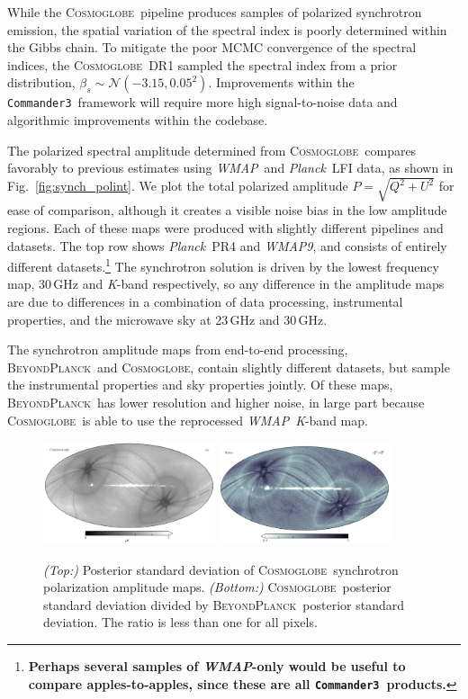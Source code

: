 \documentclass[twocolumn]{../../common/aa}
\def\WMAP{\emph{WMAP}}
\def\WMAPnine{\emph{WMAP9}}
\def\Planck{\emph{Planck}}
\def\commanderthree{\texttt{Commander3}}
\newcommand{\bp}{\textsc{BeyondPlanck}}
\newcommand{\cosmoglobe}{\textsc{Cosmoglobe}}
\newcommand{\K}[0]{\textit K}
\begin{document}
While the \cosmoglobe\ pipeline produces samples of polarized synchrotron emission, the spatial variation of the spectral index is poorly determined within the Gibbs chain. To mitigate the poor MCMC convergence of the spectral indices, the \cosmoglobe\ DR1 sampled the spectral index from a prior distribution, $\beta_s\sim\mathcal N(-3.15, 0.05^2)$. Improvements within the \commanderthree\ framework will require more high signal-to-noise data and algorithmic improvements within the codebase.


The polarized spectral amplitude determined from \cosmoglobe\ compares favorably to previous estimates using \WMAP\ and \Planck\ LFI data, as shown in Fig.~\ref{fig:synch_polint}. We plot the total polarized amplitude $P=\sqrt{Q^2+U^2}$ for ease of comparison, although it creates a visible noise bias in the low amplitude regions. Each of these maps were produced with slightly different pipelines and datasets. The top row shows \Planck\ PR4 and \WMAPnine, and consists of entirely different datasets.\footnote{\textbf{Perhaps several samples of \WMAP-only would be useful to compare apples-to-apples, since these are all \commanderthree\ products.}} The synchrotron solution is driven by the lowest frequency map, 30\,GHz and \K-band respectively, so any difference in the amplitude maps are due to differences in a combination of data processing, instrumental properties, and the microwave sky at 23\,GHz and 30\,GHz.

The synchrotron amplitude maps from end-to-end processing, \bp\ and \cosmoglobe, contain slightly different datasets, but sample the instrumental properties and sky properties jointly. Of these maps, \bp\ has lower resolution and higher noise, in large part because \cosmoglobe\ is able to use the reprocessed \WMAP\ \K-band map.

\begin{figure}
	\includegraphics[width=0.45\textwidth]{figures/polint_CG_sigma.pdf}
	\includegraphics[width=0.45\textwidth]{figures/polint_sigma_ratio.pdf}
	\caption{
		\textit{(Top:)} Posterior standard deviation of \cosmoglobe\ synchrotron polarization amplitude maps.
		\textit{(Bottom:)} \cosmoglobe\ posterior standard deviation divided by \bp\ posterior standard deviation. The ratio is less than one for all pixels.
		}
		\label{fig:rms_ratios}
\end{figure}
\end{document}
